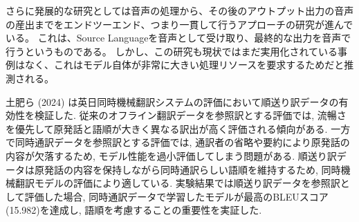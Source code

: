 さらに発展的な研究としては音声の処理から、その後のアウトプット出力の音声の産出までをエンドツーエンド、つまり一貫して行うアプローチの研究が進んでいる。
これは、Source Languageを音声として受け取り、最終的な出力を音声で行うというものである。
しかし、この研究も現状ではまだ実用化されている事例はなく、これはモデル自体が非常に大きい処理リソースを要求するためだと推測される。

土肥ら (2024) \cite{doi2024evaluation}は英日同時機械翻訳システムの評価において順送り訳データの有効性を検証した.
従来のオフライン翻訳データを参照訳とする評価では, 流暢さを優先して原発話と語順が大きく異なる訳出が高く評価される傾向がある.
一方で同時通訳データを参照訳とする評価では, 通訳者の省略や要約により原発話の内容が欠落するため, モデル性能を過小評価してしまう問題がある.
順送り訳データは原発話の内容を保持しながら同時通訳らしい語順を維持するため, 同時機械翻訳モデルの評価により適している.
実験結果では順送り訳データを参照訳として評価した場合, 同時通訳データで学習したモデルが最高のBLEUスコア(15.982)を達成し, 語順を考慮することの重要性を実証した.